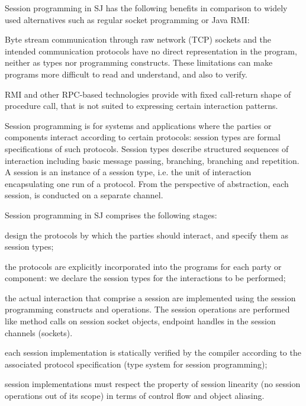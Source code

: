 Session programming in SJ has the following benefits in comparison to widely used alternatives such as regular socket programming or Java RMI:

\begin{compactenum}
\item  Byte stream communication through raw network (TCP) sockets and the intended communication protocols have no direct representation in the program, neither as types nor programming constructs. These limitations can make programs more difficult to read and understand, and also to verify.

\item  RMI and other RPC-based technologies provide with fixed call-return shape of procedure call, that is not suited to expressing certain interaction patterns.
\end{compactenum}

Session programming is for systems and applications where the parties or components interact according to certain protocols: session types are formal specifications of such protocols. Session types describe structured sequences of interaction including basic message passing, branching, branching and repetition. A session is an instance of a session type, i.e. the unit of interaction encapsulating one run of a protocol. From the perspective of abstraction, each session, is conducted on a separate channel.

Session programming in SJ comprises the following stages:
\begin{compactenum}
\item design the protocols by which the parties should interact, and specify them as session types;

\item  the protocols are explicitly incorporated into the programs for each party or component: we declare the session types for the interactions to be performed;

\item  the actual interaction that comprise a session are implemented using the session programming constructs and operations. The session operations are performed like method calls on session socket objects, endpoint handles in the session channels (sockets).

\item  each session implementation is statically verified by the compiler according to the associated protocol specification (type system for session programming);

\item  session implementations must respect the property of session linearity (no session operations out of its scope) in terms of control flow and object aliasing.
\end{compactenum}


